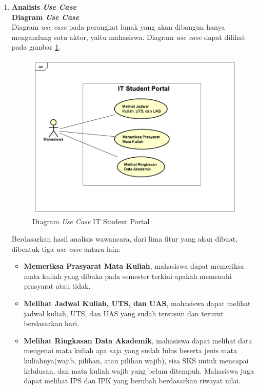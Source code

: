 \documentclass[a4paper,twoside]{article}
\begin{document}
\begin{enumerate}
\begin{enumerate}
\item \textbf{Analisis \textit{Use Case}}\\
\textbf{Diagram \textit{Use Case}}\\
Diagram \textit{use case} pada perangkat lunak yang akan dibangun hanya mengandung satu aktor, yaitu mahasiswa. Diagram \textit{use case} dapat dilihat pada gambar \ref{fig:3_usecase_diagram}. 
		\begin{figure}[H]
			\centering
			\includegraphics[scale=0.5]{Gambar/usecase-diagram}
			\caption{Diagram \textit{Use Case} IT Student Portal} 
			\label{fig:3_usecase_diagram}
		\end{figure}
Berdasarkan hasil analisis wawancara, dari lima fitur yang akan dibuat, dibentuk tiga \textit{use case} antara lain:
\begin{itemize}
	\item \textbf{Memeriksa Prasyarat Mata Kuliah}, mahasiswa dapat memeriksa mata kuliah yang dibuka pada semester terkini apakah memenuhi prasyarat atau tidak. 
	\item \textbf{Melihat Jadwal Kuliah, UTS, dan UAS}, mahasiswa dapat melihat jadwal kuliah, UTS, dan UAS yang sudah tersusun dan terurut berdasarkan hari.
	\item \textbf{Melihat Ringkasan Data Akademik}, mahasiswa dapat melihat data mengenai mata kuliah apa saja yang sudah lulus beserta jenis mata kuliahnya(wajib, pilihan, atau pilihan wajib), sisa SKS untuk mencapai kelulusan, dan mata kuliah wajib yang belum ditempuh. Mahasiswa juga dapat melihat IPS dan IPK yang berubah berdasarkan riwayat nilai.
\end{itemize}


\end{enumerate}
\end{enumerate}
\end{document}
